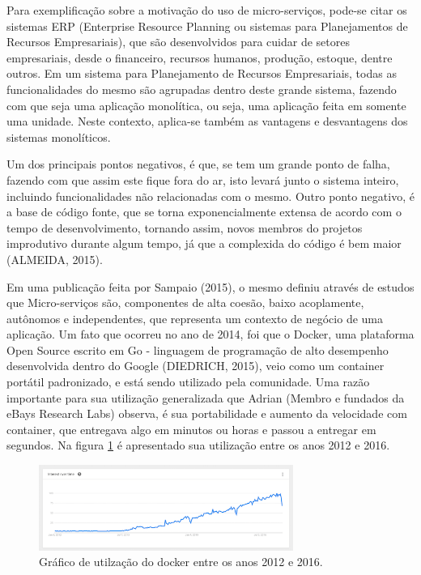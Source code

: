 \documentclass[journal]{IEEEtran}
\begin{document}
Para exemplificação sobre a motivação do uso de micro-serviços, pode-se citar os sistemas ERP (Enterprise Resource Planning ou sistemas para Planejamentos de Recursos Empresariais), que são desenvolvidos para cuidar de setores empresariais, desde o financeiro, recursos humanos, produção, estoque, dentre outros. Em um sistema para Planejamento de Recursos Empresariais, todas as funcionalidades do mesmo são agrupadas dentro deste grande sistema, fazendo com que seja uma aplicação monolítica, ou seja, uma aplicação feita em somente uma unidade. Neste contexto, aplica-se também as vantagens e desvantagens dos sistemas monolíticos.

Um dos principais pontos negativos, é que, se tem um grande ponto de falha, fazendo com que assim este fique fora do ar, isto levará junto o sistema inteiro, incluindo funcionalidades não relacionadas com o mesmo. Outro ponto negativo, é a base de código fonte, que se torna exponencialmente extensa de acordo com o tempo de desenvolvimento, tornando assim, novos membros do projetos improdutivo durante algum tempo, já que a complexida do código é bem maior (ALMEIDA, 2015).

Em uma publicação feita por Sampaio (2015), o mesmo definiu através de estudos que Micro-serviços são, componentes de alta coesão, baixo acoplamente, autônomos e independentes, que representa um contexto de negócio de uma aplicação. Um fato que ocorreu no ano de 2014, foi que o Docker, uma plataforma Open Source escrito em Go - linguagem de programação de alto desempenho desenvolvida dentro do Google (DIEDRICH, 2015), veio como um container portátil padronizado, e está sendo utilizado pela comunidade. Uma razão importante para sua utilização generalizada que Adrian (Membro e fundados da eBays Research Labs) observa, é sua portabilidade e aumento da velocidade com container, que entregava algo em minutos ou horas e passou a entregar em segundos. Na figura \ref{fig:utilizacao-docker} é apresentado sua utilização entre os anos 2012 e 2016.

\begin{figure}[h]
\centering
\includegraphics[height=1.1in]{docker}
\caption{Gráfico de utilzação do docker entre os anos 2012 e 2016.}
\label{fig:utilizacao-docker}
\end{figure}
\end{document}
